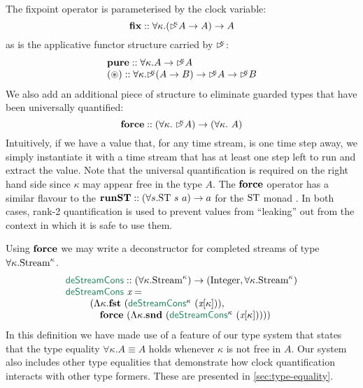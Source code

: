 The fixpoint operator is parameterised by the clock variable:
\begin{displaymath}
  \textbf{fix} :: \forall \kappa. (\mathord{\rhd\kern-0.4em^{\kappa}} A \to A) \to A
\end{displaymath}
as is the applicative functor structure carried by $\mathord{\rhd\kern-0.4em^{\kappa}}$:
\begin{displaymath}
  \begin{array}{l}
    \textbf{pure} :: \forall \kappa. A \to \mathord{\rhd\kern-0.4em^{\kappa}} A \\
    \textbf{$(\circledast)$} :: \forall \kappa. \mathord{\rhd\kern-0.4em^{\kappa}} (A \to B) \to \mathord{\rhd\kern-0.4em^{\kappa}} A \to \mathord{\rhd\kern-0.4em^{\kappa}} B
  \end{array}
\end{displaymath}
We also add an additional piece of structure to eliminate guarded
types that have been universally quantified:
\begin{displaymath}
  \textbf{force} :: (\forall \kappa.\ \mathord{\rhd\kern-0.4em^{\kappa}} A) \to (\forall \kappa.\ A)
\end{displaymath}
Intuitively, if we have a value that, for any time stream, is one time
step away, we simply instantiate it with a time stream that has at
least one step left to run and extract the value. Note that the
universal quantification is required on the right hand side since
$\kappa$ may appear free in the type $A$. The $\textbf{force}$ operator
has a similar flavour to the $\textbf{runST} :: (\forall s. \textrm{ST}\
s\ a) \to a$ for the $\textrm{ST}$ monad
\cite{DBLP:journals/jfp/MoggiS01,launchbury94lazy}. In both cases,
rank-2 quantification is used to prevent values from ``leaking'' out
from the context in which it is safe to use them.

Using $\textbf{force}$ we may write a deconstructor for completed streams
of type $\forall \kappa. \textrm{Stream}^\kappa$.
\begin{displaymath}
  \begin{array}{l}
    \elim{deStreamCons} :: (\forall \kappa. \tyname{Stream}^\kappa) \to (\tyname{Integer}, \forall \kappa. \tyname{Stream}^\kappa) \\
    \elim{deStreamCons}\ \ident{x} = \\
    \quad\quad
    \begin{array}[t]{l}
      (\Lambda \kappa. \kw{fst}\ (\elim{deStreamCons}^\kappa\ (\ident{x}[\kappa])),\\
      \quad\kw{force}\ (\Lambda \kappa. \kw{snd}\ (\elim{deStreamCons}^\kappa\ (\ident{x}[\kappa]))))
    \end{array}
  \end{array}
\end{displaymath}
In this definition we have made use of a feature of our type system
that states that the type equality $\forall \kappa. A \equiv A$ holds
whenever $\kappa$ is not free in $A$. Our system also includes other
type equalities that demonstrate how clock quantification interacts
with other type formers. These are presented in
\autoref{sec:type-equality}.

